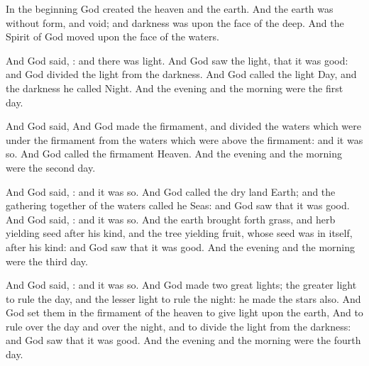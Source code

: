 
\Verse In the beginning God created the heaven and the earth.  
\Verse And the earth was without form, and void; and darkness was upon the face of the deep.  And the Spirit of God moved upon the face of the waters.

\Verse And God said, : and there was light.  
\Verse And God saw the light, that it was good: and God divided the light from the darkness.  
\Verse And God called the light Day, and the darkness he called Night.  And the evening and the morning were the first day.

\Verse And God said, 
\Verse And God made the firmament, and divided the waters which were under the firmament from the waters which were above the firmament: and it was so.  
\Verse And God called the firmament Heaven.  And the evening and the morning were the second day.

\Verse And God said, : and it was so.  
\Verse And God called the dry land Earth; and the gathering together of the waters called he Seas: and God saw that it was good.  
\Verse And God said, : and it was so.  
\Verse And the earth brought forth grass, and herb yielding seed after his kind, and the tree yielding fruit, whose seed was in itself, after his kind: and God saw that it was good.  
\Verse And the evening and the morning were the third day.

\Verse And God said, : and it was so.  
\Verse And God made two great lights; the greater light to rule the day, and the lesser light to rule the night: he made the stars also.  
\Verse And God set them in the firmament of the heaven to give light upon the earth, 
\Verse And to rule over the day and over the night, and to divide the light from the darkness: and God saw that it was good.  
\Verse And the evening and the morning were the fourth day.

